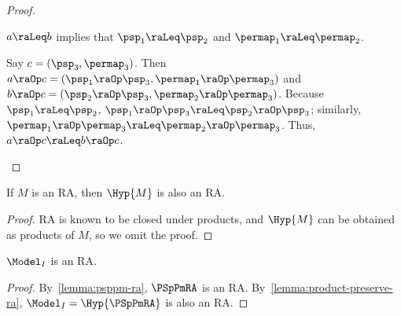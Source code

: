 \begin{proof}
\begin{induction}
      $a \raLeq b $ implies that
      $\psp_1 \raLeq \psp_2$ and $\permap_1 \raLeq \permap_2$.

      Say $c = (\psp_3, \permap_3)$.
      Then $a \raOp c = (\psp_1 \raOp \psp_3, \permap_1 \raOp \permap_3)$ and $b \raOp c = (\psp_2 \raOp \psp_3, \permap_2 \raOp \permap_3)$.
      Because $\psp_1 \raLeq \psp_2$,
      $\psp_1 \raOp \psp_3 \raLeq \psp_2 \raOp \psp_3$;
      similarly,
      $\permap_1 \raOp \permap_3 \raLeq \permap_2 \raOp \permap_3$.
      Thus, $a \raOp c \raLeq b \raOp c$.
      \qedhere
  \end{induction}
\end{proof}

  \begin{lemma}
    \label{lemma:product-preserve-ra}
    If $M$ is an RA, then $\Hyp{M}$ is also an RA.
  \end{lemma}

  \begin{proof}
    RA is known to be closed under products, and
    $\Hyp{M}$ can be obtained as products of $M$,
    so we omit the proof.
  \end{proof}

  \begin{lemma}
  $\Model_I$ is an RA.
\end{lemma}

\begin{proof}
  By~\cref{lemma:psppm-ra}, $\PSpPmRA$ is an RA.
  By~\cref{lemma:product-preserve-ra},
  $\Model_I = \Hyp{\PSpPmRA}$ is also an RA.
\end{proof}

